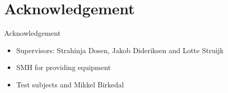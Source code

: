 \documentclass[10pt]{beamer}
\begin{document}
\section{Acknowledgement}
\begin{frame}{Acknowledgement}
\begin{itemize}
	\item Supervisors: Strahinja Dosen, Jakob Dideriksen and Lotte Struijk
	\item SMH for providing equipment
	\item Test subjects and Mikkel Birkedal
\end{itemize}

\end{frame}


{\aauwavesbg
\begin{frame}
\end{frame}}
\end{document}
